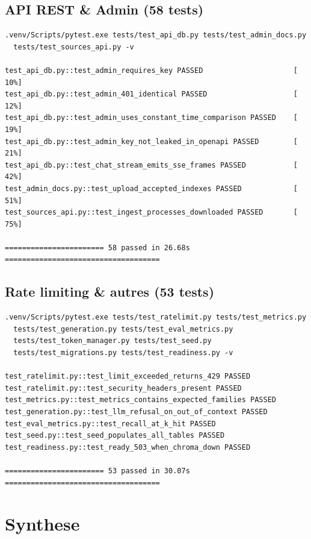 \documentclass[12pt,a4paper,oneside]{article}
\begin{document}
\subsection{API REST \& Admin (58 tests)}

\begin{verbatim}
.venv/Scripts/pytest.exe tests/test_api_db.py tests/test_admin_docs.py
  tests/test_sources_api.py -v

test_api_db.py::test_admin_requires_key PASSED                     [ 10%]
test_api_db.py::test_admin_401_identical PASSED                    [ 12%]
test_api_db.py::test_admin_uses_constant_time_comparison PASSED    [ 19%]
test_api_db.py::test_admin_key_not_leaked_in_openapi PASSED        [ 21%]
test_api_db.py::test_chat_stream_emits_sse_frames PASSED           [ 42%]
test_admin_docs.py::test_upload_accepted_indexes PASSED            [ 51%]
test_sources_api.py::test_ingest_processes_downloaded PASSED       [ 75%]

======================= 58 passed in 26.68s ====================================
\end{verbatim}

\subsection{Rate limiting \& autres (53 tests)}

\begin{verbatim}
.venv/Scripts/pytest.exe tests/test_ratelimit.py tests/test_metrics.py
  tests/test_generation.py tests/test_eval_metrics.py
  tests/test_token_manager.py tests/test_seed.py
  tests/test_migrations.py tests/test_readiness.py -v

test_ratelimit.py::test_limit_exceeded_returns_429 PASSED
test_ratelimit.py::test_security_headers_present PASSED
test_metrics.py::test_metrics_contains_expected_families PASSED
test_generation.py::test_llm_refusal_on_out_of_context PASSED
test_eval_metrics.py::test_recall_at_k_hit PASSED
test_seed.py::test_seed_populates_all_tables PASSED
test_readiness.py::test_ready_503_when_chroma_down PASSED

======================= 53 passed in 30.07s ====================================
\end{verbatim}

\clearpage

\section*{Synthese}
\end{document}
